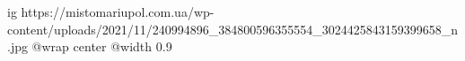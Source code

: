  
 
 
 
 

\ifcmt
  ig https://mistomariupol.com.ua/wp-content/uploads/2021/11/240994896_384800596355554_3024425843159399658_n.jpg
  @wrap center
  @width 0.9
\fi
